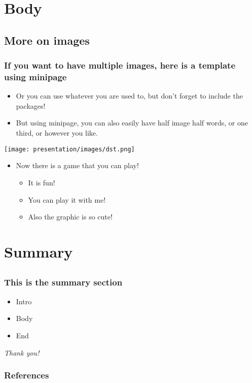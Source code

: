 \documentclass[aspectratio=169]{beamer}
\begin{document}
\section{Body}
\subsection{More on images}

\begin{frame}[fragile]
	\frametitle{If you want to have multiple images, here is a template using minipage}
	\begin{itemize}
	    \item Or you can use whatever you are used to, but don't forget to include the packages! 
	    \item But using minipage, you can also easily have half image half words, or one third, or however you like.
	\end{itemize}

    \begin{minipage}{.5\textwidth}
      \centering
      \texttt{[image: presentation/images/dst.png]}
    \end{minipage}%
    \begin{minipage}{.5\textwidth}
      \begin{itemize}
          \item Now there is a game that you can play!
          \begin{itemize}
              \item It is fun!
              \item You can play it with me! 
              \item Also the graphic is so cute! 
          \end{itemize}
      \end{itemize}
    \end{minipage}
\end{frame}


\section{Summary}
\subsection{}

\begin{frame}
	\frametitle{This is the summary section}
	\begin{itemize}
	    \item Intro
	    \item Body 
	    \item End
	\end{itemize}
	
	\vspace{10mm}
	\Large
	\hfill\textit{Thank you!}
\end{frame}

\begin{frame}
	\frametitle{References}
	
	\nocite{*}
	
\end{frame}
\end{document}
